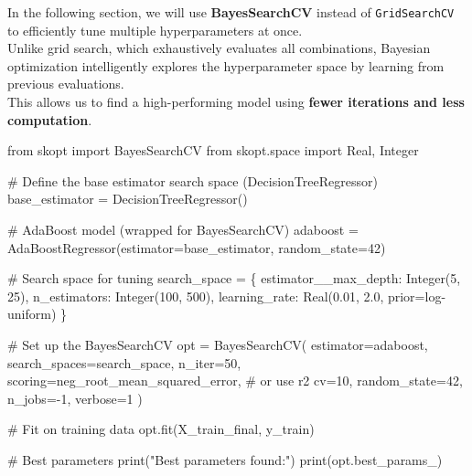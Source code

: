 \documentclass[
  letterpaper,
  DIV=11,
  numbers=noendperiod]{scrreprt}
\newenvironment{Shaded}{\begin{snugshade}}{\end{snugshade}}
\newcommand{\BuiltInTok}[1]{\textcolor[rgb]{0.00,0.23,0.31}{#1}}
\newcommand{\CommentTok}[1]{\textcolor[rgb]{0.37,0.37,0.37}{#1}}
\newcommand{\DecValTok}[1]{\textcolor[rgb]{0.68,0.00,0.00}{#1}}
\newcommand{\FloatTok}[1]{\textcolor[rgb]{0.68,0.00,0.00}{#1}}
\newcommand{\ImportTok}[1]{\textcolor[rgb]{0.00,0.46,0.62}{#1}}
\newcommand{\NormalTok}[1]{\textcolor[rgb]{0.00,0.23,0.31}{#1}}
\newcommand{\OperatorTok}[1]{\textcolor[rgb]{0.37,0.37,0.37}{#1}}
\newcommand{\StringTok}[1]{\textcolor[rgb]{0.13,0.47,0.30}{#1}}
\begin{document}
In the following section, we will use \textbf{BayesSearchCV} instead of
\texttt{GridSearchCV} to efficiently tune multiple hyperparameters at
once.\\
Unlike grid search, which exhaustively evaluates all combinations,
Bayesian optimization intelligently explores the hyperparameter space by
learning from previous evaluations.\\
This allows us to find a high-performing model using \textbf{fewer
iterations and less computation}.

\begin{Shaded}
\begin{Highlighting}[]
\ImportTok{from}\NormalTok{ skopt }\ImportTok{import}\NormalTok{ BayesSearchCV}
\ImportTok{from}\NormalTok{ skopt.space }\ImportTok{import}\NormalTok{ Real, Integer}

\CommentTok{\# Define the base estimator search space (DecisionTreeRegressor)}
\NormalTok{base\_estimator }\OperatorTok{=}\NormalTok{ DecisionTreeRegressor()}

\CommentTok{\# AdaBoost model (wrapped for BayesSearchCV)}
\NormalTok{adaboost }\OperatorTok{=}\NormalTok{ AdaBoostRegressor(estimator}\OperatorTok{=}\NormalTok{base\_estimator, random\_state}\OperatorTok{=}\DecValTok{42}\NormalTok{)}

\CommentTok{\# Search space for tuning}
\NormalTok{search\_space }\OperatorTok{=}\NormalTok{ \{}
    \StringTok{\textquotesingle{}estimator\_\_max\_depth\textquotesingle{}}\NormalTok{: Integer(}\DecValTok{5}\NormalTok{, }\DecValTok{25}\NormalTok{),}
    \StringTok{\textquotesingle{}n\_estimators\textquotesingle{}}\NormalTok{: Integer(}\DecValTok{100}\NormalTok{, }\DecValTok{500}\NormalTok{),}
    \StringTok{\textquotesingle{}learning\_rate\textquotesingle{}}\NormalTok{: Real(}\FloatTok{0.01}\NormalTok{, }\FloatTok{2.0}\NormalTok{, prior}\OperatorTok{=}\StringTok{\textquotesingle{}log{-}uniform\textquotesingle{}}\NormalTok{)}
\NormalTok{\}}

\CommentTok{\# Set up the BayesSearchCV}
\NormalTok{opt }\OperatorTok{=}\NormalTok{ BayesSearchCV(}
\NormalTok{    estimator}\OperatorTok{=}\NormalTok{adaboost,}
\NormalTok{    search\_spaces}\OperatorTok{=}\NormalTok{search\_space,}
\NormalTok{    n\_iter}\OperatorTok{=}\DecValTok{50}\NormalTok{,}
\NormalTok{    scoring}\OperatorTok{=}\StringTok{\textquotesingle{}neg\_root\_mean\_squared\_error\textquotesingle{}}\NormalTok{,  }\CommentTok{\# or use \textquotesingle{}r2\textquotesingle{}}
\NormalTok{    cv}\OperatorTok{=}\DecValTok{10}\NormalTok{,}
\NormalTok{    random\_state}\OperatorTok{=}\DecValTok{42}\NormalTok{,}
\NormalTok{    n\_jobs}\OperatorTok{={-}}\DecValTok{1}\NormalTok{,}
\NormalTok{    verbose}\OperatorTok{=}\DecValTok{1}
\NormalTok{)}

\CommentTok{\# Fit on training data}
\NormalTok{opt.fit(X\_train\_final, y\_train)}

\CommentTok{\# Best parameters}
\BuiltInTok{print}\NormalTok{(}\StringTok{"Best parameters found:"}\NormalTok{)}
\BuiltInTok{print}\NormalTok{(opt.best\_params\_)}
\end{Highlighting}
\end{Shaded}
\end{document}
